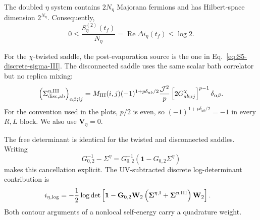 \documentclass[11pt,a4paper]{article}
\begin{document}
The doubled \(\eta\) system contains \(2N_\eta\) Majorana fermions and has
Hilbert-space dimension \(2^{N_\eta}\). Consequently,
\begin{equation}
  0
  \leq
  \frac{S_\eta^{(2)}(t_f)}{N_\eta}
  =
  \operatorname{Re}\Delta i_\eta(t_f)
  \leq
  \log2.
\label{eq:S5-entropy-bound}
\end{equation}

For the \(\chi\)-twisted saddle, the post-evaporation source is the one in
Eq.~\eqref{eq:S5-discrete-sigma-III}. The disconnected saddle uses the same
scalar bath correlator but no replica mixing:
\begin{equation}
  \left(
  \Sigma^{\eta,\rm III}_{\rm disc,ab}
  \right)_{\alpha\beta;ij}
  =
  M_{\rm III}(i,j)
  (-1)^{1+p\delta_{ab}/2}
  \frac{\mathcal J^2}{p}
  \left[
  2G^\chi_{ab;ij}
  \right]^{p-1}
  \delta_{\alpha\beta}.
\label{eq:S5-disconnected-source}
\end{equation}
For the convention used in the plots, \(p/2\) is even, so
\((-1)^{1+p\delta_{ab}/2}=-1\) in every \(R,L\) block. We also use
\(\mathbf V_\eta=0\).

The free determinant is identical for the twisted and disconnected saddles.
Writing
\[
  G_{0,2}^{-1}-\Sigma^\eta
  =
  G_{0,2}^{-1}
  \left(
  \mathbf 1-G_{0,2}\Sigma^\eta
  \right)
\]
makes this cancellation explicit. The UV-subtracted discrete
log-determinant contribution is
\begin{equation}
\begin{aligned}
  i_{\eta,\log}
  &=
  -\frac{1}{2}
  \log\det
  \left[
  \mathbf 1
  -
  \mathbf G_{0,2}
  \mathbf W_2
  \left(
  \boldsymbol\Sigma^{\eta,\rm I}
  +
  \boldsymbol\Sigma^{\eta,\rm III}
  \right)
  \mathbf W_2
  \right].
\end{aligned}
\label{eq:S5-relative-logdet}
\end{equation}
Both contour arguments of a nonlocal self-energy carry a quadrature weight.
\end{document}
